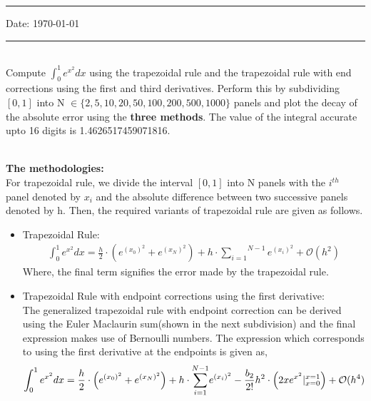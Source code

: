 \documentclass[letterpaper]{exam}
\begin{document}
\hrule
\vspace{3mm}
\noindent 
\vspace{3mm}

\noindent
{{\sf Date: \today }} %



\vspace{3mm}
\hrule
\begin{questions}
\\
Compute $\int_{0}^{1} e^{x^2} dx$ using the trapezoidal rule and the trapezoidal rule with end corrections using the first and third derivatives. Perform this by subdividing $\left[0,1\right]$ into N $\in \{2,5,10,20,50,100,200,500,1000\}$ panels and plot the decay of the absolute error using the \textbf{three methods}. The value of the integral accurate upto 16 digits is 1.4626517459071816.
\begin{solution}
\\
\textbf{The methodologies:}\\
For trapezoidal rule, we divide the interval $\left[0,1\right]$ into N panels with the $i^{th}$ panel denoted by $x_i$ and the absolute difference between two successive panels denoted by h.
Then, the required variants of trapezoidal rule are given as follows.
\begin{itemize}
    \item Trapezoidal Rule:\\
    \begin{align*}
        \int_{0}^{1} e^{x^2} dx = \frac{h}{2}\cdot\left(e^{(x_0)^2}+e^{(x_N)^2}\right) + h\cdot\overset{N-1}{\underset{i=1}{\sum}} e^{(x_i)^2} + \mathcal{O}(h^2)
    \end{align*}
    Where, the final term signifies the error made by the trapezoidal rule.
    \item Trapezoidal Rule with endpoint corrections using the first derivative:\\
    The generalized trapezoidal rule with endpoint correction can be derived using the Euler Maclaurin sum(shown in the next subdivision) and the final expression makes use of Bernoulli numbers. The expression which corresponds to using the first derivative at the endpoints is given as,
    \begin{align*}
        \int_{0}^{1} e^{x^2} dx &= \frac{h}{2}\cdot\left(e^{(x_0)^2}+e^{(x_N)^2}\right) + h\cdot\overset{N-1}{\underset{i=1}{\sum}} e^{(x_i)^2} -\frac{b_2}{2!}h^2\cdot\left(2xe^{x^2}\huge{|}_{x=0}^{x=1}\right) + \mathcal{O}(h^4)\\

\end{align*}
\end{itemize}
\end{solution}
\end{questions}
\end{document}
